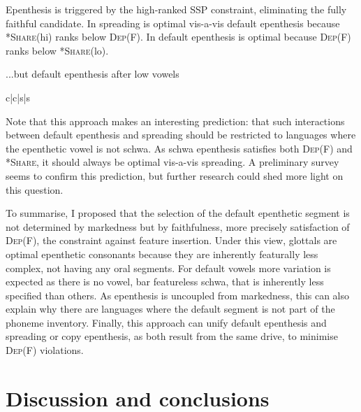 \documentclass[output=paper,colorlinks,citecolor=brown]{langscibook}
\begin{document}
Epenthesis is triggered by the high-ranked SSP constraint, eliminating the fully faithful candidate. In  spreading is optimal vis-a-vis default epenthesis because *\textsc{Share}(hi) ranks below \textsc{Dep(F)}. In  default epenthesis is optimal because \textsc{Dep(F)} ranks below *\textsc{Share}(lo).


\begin{table}
\caption{...but default epenthesis after low vowels}
\label{defep}
\ShadingOn
\begin{tableau}{c|c|s|s} 
         
\cand{[ʔakl]}              \vio{*!}  \vio{} \vio{}                                           \vio{}  
\cand{[ʔakal]}   \vio{}  \vio{*!} \vio{}                                   \vio{}     
\cand[\Optimal]{[ʔakil]}    \vio{}  \vio{} \vio{*}                                       \vio{}   
\end{tableau}
\end{table}

Note that this approach makes an interesting prediction: that such interactions between default epenthesis and spreading should be restricted to languages where the epenthetic vowel is not schwa. As schwa epenthesis satisfies both \textsc{Dep(F)} and \textsc{*Share}, it should always be optimal vis-a-vis spreading. A preliminary survey seems to confirm this prediction, but further research could shed more light on this question. 

To summarise, I proposed that the selection of the default epenthetic segment is not determined by markedness but by faithfulness, more precisely satisfaction of \textsc{Dep(F)}, the constraint against feature insertion. Under this view, glottals are optimal epenthetic consonants because they are inherently featurally less complex, not having any oral segments. For default vowels more variation is expected as there is no vowel, bar featureless schwa, that is inherently less specified than others. As epenthesis is uncoupled from markedness, this can also explain why there are languages where the default segment is not part of the phoneme inventory. Finally, this approach can unify default epenthesis and spreading or copy epenthesis, as both result from the same drive, to minimise \textsc{Dep(F)} violations. 


\section{Discussion and conclusions} \label{uffmann:disc}
\end{document}
